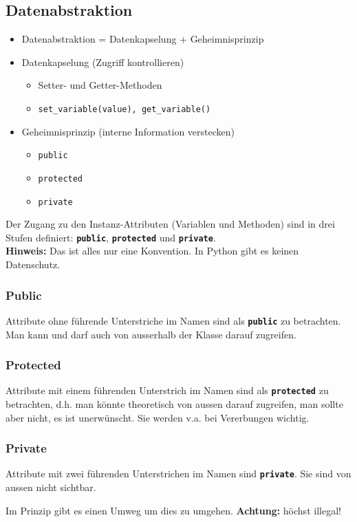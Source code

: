 \subsection{Datenabstraktion}
\begin{itemize}
	\item Datenabstraktion = Datenkapselung + Geheimnisprinzip
	\item Datenkapselung (Zugriff kontrollieren)
	\begin{itemize}
		\item Setter- und Getter-Methoden
		\item[\-] \texttt{set\_variable(value), get\_variable()}
	\end{itemize}
	\item Geheimnisprinzip (interne Information verstecken)
	\begin{itemize}
		\item \texttt{public}
		\item \texttt{protected}
		\item \texttt{private}
	\end{itemize}
\end{itemize}
Der Zugang zu den Instanz-Attributen (Variablen und Methoden) sind in drei Stufen definiert: \textbf{\texttt{public}}, \textbf{\texttt{protected}} und \textbf{\texttt{private}}.\\
\textbf{Hinweis:} Das ist alles nur eine Konvention. In Python gibt es keinen Datenschutz.


\subsubsection{Public}
Attribute ohne führende Unterstriche im Namen sind als \textbf{\texttt{public}} zu betrachten. Man kann und darf auch von ausserhalb der Klasse darauf zugreifen.


\subsubsection{Protected}
Attribute mit einem führenden Unterstrich im Namen sind als \textbf{\texttt{protected}} zu betrachten, d.h. man könnte theoretisch von aussen darauf zugreifen, man sollte aber nicht, es ist unerwünscht. Sie werden v.a. bei Vererbungen wichtig.


\subsubsection{Private}
Attribute mit zwei führenden Unterstrichen im Namen sind \textbf{\texttt{private}}. Sie sind von aussen nicht sichtbar.

Im Prinzip gibt es einen Umweg um dies zu umgehen. \textbf{Achtung:} höchst illegal!


